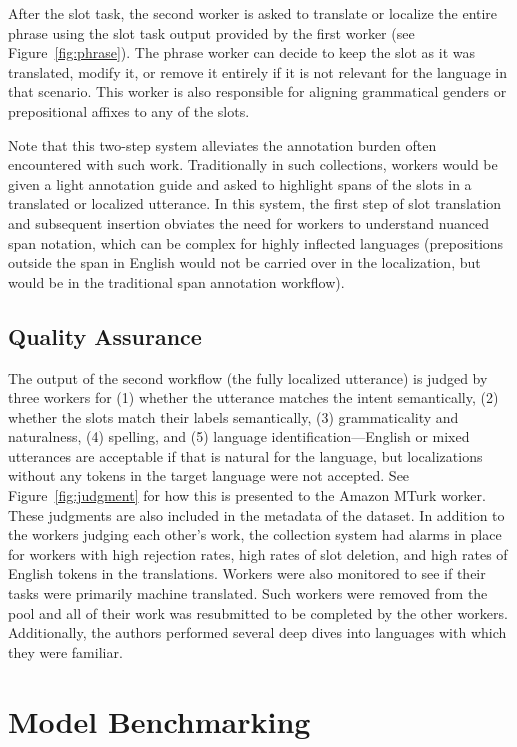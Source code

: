 \documentclass[11pt]{article}
\begin{document}
After the slot task, the second worker is asked to translate or localize the entire phrase using the slot task output provided by the first worker (see Figure~\ref{fig:phrase}).
The phrase worker can decide to keep the slot as it was translated, modify it, or remove it entirely if it is not relevant for the language in that scenario.
This worker is also responsible for aligning grammatical genders or prepositional affixes to any of the slots.

Note that this two-step system alleviates the annotation burden often encountered with such work.
Traditionally in such collections, workers would be given a light annotation guide and asked to highlight spans of the slots in a translated or localized utterance.
In this system, the first step of slot translation and subsequent insertion obviates the need for workers to understand nuanced span notation, which can be complex for highly inflected languages (prepositions outside the span in English would not be carried over in the localization, but would be in the traditional span annotation workflow).

\subsection{Quality Assurance} \label{sect:QA}

The output of the second workflow (the fully localized utterance) is judged by three workers for (1) whether the utterance matches the intent semantically, (2) whether the slots match their labels semantically, (3) grammaticality and naturalness, (4) spelling, and (5) language identification---English or mixed utterances are acceptable if that is natural for the language, but localizations without any tokens in the target language were not accepted.
See Figure~\ref{fig:judgment} for how this is presented to the Amazon MTurk worker.
These judgments are also included in the metadata of the dataset.
In addition to the workers judging each other's work, the collection system had alarms in place for workers with high rejection rates, high rates of slot deletion, and high rates of English tokens in the translations.
Workers were also monitored to see if their tasks were primarily machine translated.
Such workers were removed from the pool and all of their work was resubmitted to be completed by the other workers.
Additionally, the authors performed several deep dives into languages with which they were familiar.

\section{Model Benchmarking}
\label{sect:modeling}
\end{document}
